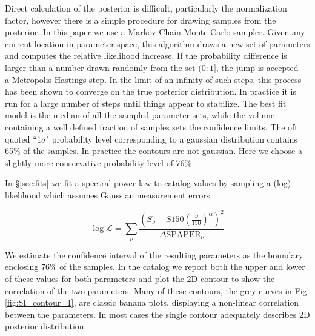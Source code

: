 \documentclass[preprint]{aastex}
\newcommand{\logL}{\log\mathcal{L}}
\begin{document}
Direct calculation of the posterior is difficult, particularly the
normalization factor, however there is a simple procedure for drawing samples
from the posterior. In this paper we use a Markov Chain Monte Carlo sampler.
Given any current location in parameter space, this algorithm draws a new set
of parameters and computes the relative likelihood increase. If the probability
difference is larger than a number drawn randomly from the set $(0:1]$, the
jump is accepted ---a Metropolis-Hastings step. In the limit of an infinity of
such steps, this process has been shown to converge on the true posterior
distribution.  In practice it is run for a large number of steps until things
appear to stabilize. The best fit model is the median of all the sampled
parameter sets, while the volume containing a well defined fraction of samples
sets the confidence limits.  The oft quoted ``1$\sigma$" probability level
corresponding to a gaussian distribution contains 65\% of the samples. In
practice the contours are not gaussian. Here we choose a slightly more
conservative probability level of 76\% 

In \S \ref{sec:fits} we fit a spectral power law to catalog values by sampling
a (log) likelihood which assumes Gaussian measurement errors

\[
\logL = \sum_\nu{\frac{\left(S_\nu - S150\left(\frac{\nu}{150}\right)^\alpha\right)^2}{\Delta \textrm{SPAPER}_\nu}} \label{eq:catlogL}
\]

We estimate the confidence interval of the resulting parameters as the boundary
enclosing 76\% of the samples. In the catalog we report both the upper and
lower of these values for both parameters and plot the 2D contour to show the
correlation of the two parameters. Many of these contours, the grey curves in
Fig. \ref{fig:SI_contour_1}, are classic banana plots, displaying a non-linear
correlation between the parameters.    In most cases the single contour
adequately describes 2D posterior distribution.
\end{document}
